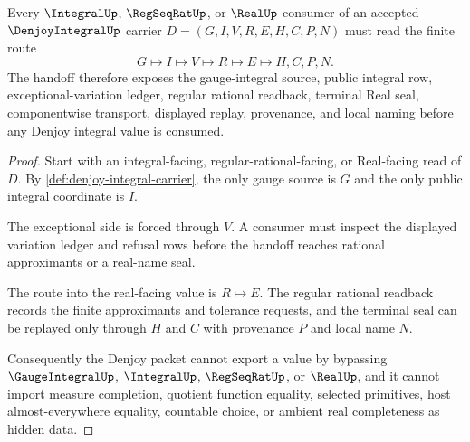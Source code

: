 \begin{theorem}
\label{thm:denjoy-integral-gauge-handoff}
Every $\IntegralUp$, $\RegSeqRatUp$, or $\RealUp$ consumer of an accepted $\DenjoyIntegralUp$ carrier $D=(G,I,V,R,E,H,C,P,N)$ must read the finite route
$$
G \longmapsto I \longmapsto V \longmapsto R \longmapsto E \longmapsto H,C,P,N .
$$
The handoff therefore exposes the gauge-integral source, public integral row, exceptional-variation ledger, regular rational readback, terminal Real seal, componentwise transport, displayed replay, provenance, and local naming before any Denjoy integral value is consumed.
\end{theorem}
\begin{proof}
Start with an integral-facing, regular-rational-facing, or Real-facing read of $D$. By \autoref{def:denjoy-integral-carrier}, the only gauge source is $G$ and the only public integral coordinate is $I$.

The exceptional side is forced through $V$. A consumer must inspect the displayed variation ledger and refusal rows before the handoff reaches rational approximants or a real-name seal.

The route into the real-facing value is $R \longmapsto E$. The regular rational readback records the finite approximants and tolerance requests, and the terminal seal can be replayed only through $H$ and $C$ with provenance $P$ and local name $N$.

Consequently the Denjoy packet cannot export a value by bypassing $\GaugeIntegralUp$, $\IntegralUp$, $\RegSeqRatUp$, or $\RealUp$, and it cannot import measure completion, quotient function equality, selected primitives, host almost-everywhere equality, countable choice, or ambient real completeness as hidden data.
\end{proof}



